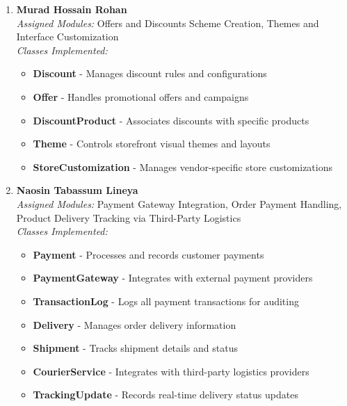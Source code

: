 \begin{enumerate}
\item \textbf{Murad Hossain Rohan} \\
\textit{Assigned Modules:} Offers and Discounts Scheme Creation, Themes and Interface Customization \\
\textit{Classes Implemented:}
\begin{itemize}
    \item \textbf{Discount} - Manages discount rules and configurations
    \item \textbf{Offer} - Handles promotional offers and campaigns
    \item \textbf{DiscountProduct} - Associates discounts with specific products
    \item \textbf{Theme} - Controls storefront visual themes and layouts
    \item \textbf{StoreCustomization} - Manages vendor-specific store customizations
\end{itemize}

\item \textbf{Naosin Tabassum Lineya} \\
\textit{Assigned Modules:} Payment Gateway Integration, Order Payment Handling, Product Delivery Tracking via Third-Party Logistics \\
\textit{Classes Implemented:}
\begin{itemize}
    \item \textbf{Payment} - Processes and records customer payments
    \item \textbf{PaymentGateway} - Integrates with external payment providers
    \item \textbf{TransactionLog} - Logs all payment transactions for auditing
    \item \textbf{Delivery} - Manages order delivery information
    \item \textbf{Shipment} - Tracks shipment details and status
    \item \textbf{CourierService} - Integrates with third-party logistics providers
    \item \textbf{TrackingUpdate} - Records real-time delivery status updates
\end{itemize}


\end{enumerate}
